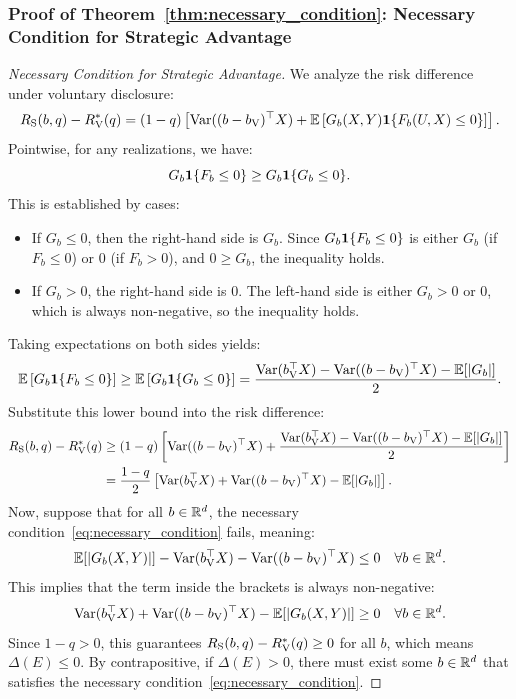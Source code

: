 \subsubsection*{Proof of Theorem~\ref{thm:necessary_condition}: Necessary Condition for Strategic Advantage}
\label{app:proof_necessary_condition}
\begin{proof}[Necessary Condition for Strategic Advantage]
We analyze the risk difference under voluntary disclosure:
\begin{equation}
    R_{\mathrm{S}}(b, q) - R_{\mathrm{V}}^*(q) = (1 - q) \left[ \mathrm{Var}((b - b_{\mathrm{V}})^\top X) + \mathbb{E}\left[ G_b(X, Y) \mathbf{1}\{F_b(U, X) \le 0\} \right] \right].
\end{equation}
Pointwise, for any realizations, we have:
\begin{equation}
    G_b \mathbf{1}\{F_b \le 0\} \ge G_b \mathbf{1}\{G_b \le 0\}.
\end{equation}
This is established by cases:
\begin{itemize}
    \item If $G_b \le 0$, then the right-hand side is $G_b$. Since $G_b \mathbf{1}\{F_b \le 0\}$ is either $G_b$ (if $F_b \le 0$) or $0$ (if $F_b > 0$), and $0 \ge G_b$, the inequality holds.
    \item If $G_b > 0$, the right-hand side is $0$. The left-hand side is either $G_b > 0$ or $0$, which is always non-negative, so the inequality holds.
\end{itemize}
Taking expectations on both sides yields:
\begin{equation}
    \mathbb{E}\left[ G_b \mathbf{1}\{F_b \le 0\} \right] \ge \mathbb{E}\left[ G_b \mathbf{1}\{G_b \le 0\} \right] = \frac{\mathrm{Var}(b_{\mathrm{V}}^\top X) - \mathrm{Var}((b - b_{\mathrm{V}})^\top X) - \mathbb{E}[|G_b|]}{2}.
\end{equation}
Substitute this lower bound into the risk difference:
\begin{align}
    R_{\mathrm{S}}(b, q) - R_{\mathrm{V}}^*(q) &\ge (1 - q) \left[ \mathrm{Var}((b - b_{\mathrm{V}})^\top X) + \frac{\mathrm{Var}(b_{\mathrm{V}}^\top X) - \mathrm{Var}((b - b_{\mathrm{V}})^\top X) - \mathbb{E}[|G_b|]}{2} \right] \nonumber \\
    &= \frac{1 - q}{2} \left[ \mathrm{Var}(b_{\mathrm{V}}^\top X) + \mathrm{Var}((b - b_{\mathrm{V}})^\top X) - \mathbb{E}[|G_b|] \right].
\end{align}
Now, suppose that for all $b \in \mathbb{R}^d$, the necessary condition~\eqref{eq:necessary_condition} fails, meaning:
\begin{equation}
    \mathbb{E}[|G_b(X, Y)|] - \mathrm{Var}(b_{\mathrm{V}}^\top X) - \mathrm{Var}((b - b_{\mathrm{V}})^\top X) \le 0 \quad \forall b \in \mathbb{R}^d.
\end{equation}
This implies that the term inside the brackets is always non-negative:
\begin{equation}
    \mathrm{Var}(b_{\mathrm{V}}^\top X) + \mathrm{Var}((b - b_{\mathrm{V}})^\top X) - \mathbb{E}[|G_b(X, Y)|] \ge 0 \quad \forall b \in \mathbb{R}^d.
\end{equation}
Since $1 - q > 0$, this guarantees $R_{\mathrm{S}}(b, q) - R_{\mathrm{V}}^*(q) \ge 0$ for all $b$, which means $\Delta(E) \le 0$. By contrapositive, if $\Delta(E) > 0$, there must exist some $b \in \mathbb{R}^d$ that satisfies the necessary condition~\eqref{eq:necessary_condition}.
\end{proof}

